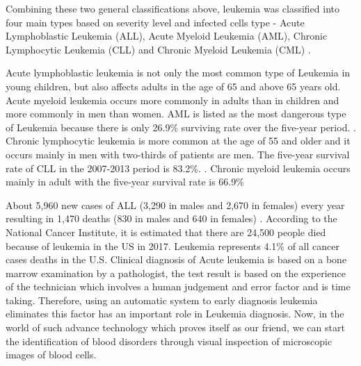 \documentclass[review]{elsarticle}
\begin{document}
Combining these two general classifications above, leukemia was classified into four main types based on severity level and infected cells type - Acute Lymphoblastic Leukemia (ALL), Acute Myeloid Leukemia (AML), Chronic Lymphocytic Leukemia (CLL) and Chronic Myeloid Leukemia (CML) \citep{Intro2}. 

Acute lymphoblastic leukemia is not only the most common type of Leukemia in young children, but also affects adults in the age of 65 and above 65 years old. Acute myeloid leukemia occurs more commonly in adults than in children and more commonly in men than women. AML is listed as the most dangerous type of Leukemia because there is only 26.9\% surviving rate over the five-year period. \citep{Intro3} . Chronic lymphocytic leukemia is more common at the age of 55 and older and it occurs mainly in men with two-thirds of patients are men. The five-year survival rate of CLL in the 2007-2013 period is 83.2\%. \citep{Intro4}. Chronic myeloid leukemia occurs mainly in adult with the five-year survival rate is 66.9\%  

About 5,960 new cases of ALL (3,290 in males and 2,670 in females) every year resulting in 1,470 deaths (830 in males and 640 in females) \citep{Intro5}. According to the National Cancer Institute, it is estimated that there are 24,500 people died because of leukemia in the US in 2017. Leukemia represents 4.1\% of all cancer cases deaths in the U.S. \citep{Intro6} Clinical diagnosis of Acute leukemia is based on a bone marrow examination by a pathologist, the test result is based on the experience of the technician which involves a human judgement and error factor and is time taking. Therefore, using an automatic system to early diagnosis leukemia eliminates this factor has an important role in Leukemia diagnosis. Now, in the world of such advance technology which proves itself as our friend, we can start the identification of blood disorders through visual inspection of microscopic images of blood cells. 
\end{document}
